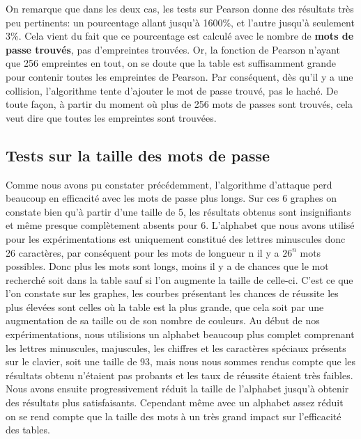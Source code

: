 \documentclass[french,12pt]{article}
\begin{document}
    On remarque que dans les deux cas, les tests sur Pearson donne des résultats très peu pertinents: un pourcentage allant jusqu'à 1600\%, et l'autre jusqu'à seulement 3\%. Cela vient du fait que ce pourcentage est calculé avec le nombre de \textbf{mots de passe trouvés}, pas d'empreintes trouvées. Or, la fonction de Pearson n'ayant que 256 empreintes en tout, on se doute que la table est suffisamment grande pour contenir toutes les empreintes de Pearson. Par conséquent, dès qu'il y a une collision, l'algorithme tente d'ajouter le mot de passe trouvé, pas le haché. De toute façon, à partir du moment où plus de 256 mots de passes sont trouvés, cela veut dire que toutes les empreintes sont trouvées.
    
     \subsection{Tests sur la taille des mots de passe}

    Comme nous avons pu constater précédemment, l'algorithme d'attaque perd beaucoup en efficacité avec les mots de passe plus longs. Sur ces 6 graphes on constate bien qu'à partir d'une taille de 5, les résultats obtenus sont insignifiants et même presque complètement absents pour 6. L'alphabet que nous avons utilisé pour les expérimentations est uniquement constitué des lettres minuscules donc 26 caractères, par conséquent pour les mots de longueur n il y a $26^n$ mots possibles. Donc plus les mots sont longs, moins il y a de chances que le mot recherché soit dans la table sauf si l'on augmente la taille de celle-ci. C'est ce que l'on constate sur les graphes, les courbes présentant les chances de réussite les plus élevées sont celles où la table est la plus grande, que cela soit par une augmentation de sa taille ou de son nombre de couleurs. Au début de nos expérimentations, nous utilisions un alphabet beaucoup plus complet comprenant les lettres minuscules, majuscules, les chiffres et les caractères spéciaux présents sur le clavier, soit une taille de 93, mais nous nous sommes rendus compte que les résultats obtenu n'étaient pas probants et les taux de réussite étaient très faibles. Nous avons ensuite progressivement réduit la taille de l'alphabet jusqu'à obtenir des résultats plus satisfaisants. Cependant même avec un alphabet assez réduit on se rend compte que la taille des mots à un très grand impact sur l'efficacité des tables.
\end{document}
